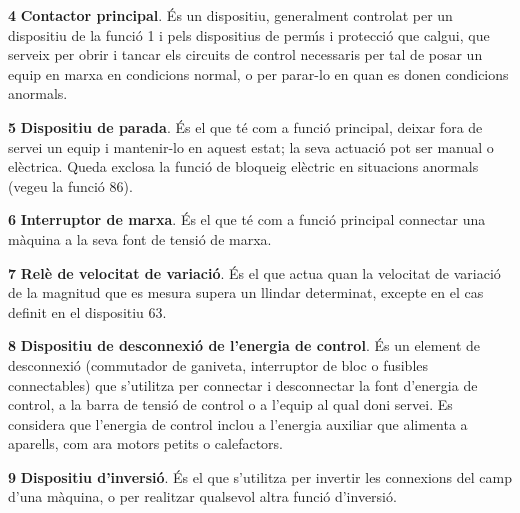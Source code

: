 \begin{multicols}{2}
\begin{list}{}
\item[\textbf{4}]  
 \textbf{Contactor principal}. \'{E}s un dispositiu,
generalment controlat per un dispositiu de la funci\'{o} 1 i pels dispositius de perm\'{\i}s i protecci\'{o}
que calgui, que serveix per obrir i tancar els circuits de control necessaris per tal de
posar un equip en marxa en condicions normal, o per parar-lo en quan es donen condicions anormals.

\item[\textbf{5}]    
 \textbf{Dispositiu de parada}. \'{E}s el que
t\'{e} com a funci\'{o} principal, deixar fora de servei un equip i
mantenir-lo en aquest estat; la seva actuaci\'{o} pot ser manual o
el\`{e}ctrica. Queda exclosa la funci\'{o} de bloqueig el\`{e}ctric en
situacions anormals (vegeu la funci\'{o} 86).

\item[\textbf{6}]  
\textbf{Interruptor de marxa}. \'{E}s
el que t\'{e} com a funci\'{o} principal connectar una m\`{a}quina a la seva font de tensi\'{o} de marxa.

\item[\textbf{7}]    
\textbf{Rel\`{e} de velocitat de variaci\'{o}}. \'{E}s el que
actua quan la velocitat de variaci\'{o} de la magnitud que es mesura supera un llindar determinat, excepte en el cas definit en el dispositiu 63.

\item[\textbf{8}]   
\textbf{Dispositiu de desconnexi\'{o} de l'energia
de control}. \'{E}s un element de desconnexi\'{o} (commutador de ganiveta,
interruptor de bloc o fusibles connectables) que s'utilitza per
connectar i desconnectar la font d'energia de control,  a la barra
de tensi\'{o} de control o a l'equip al qual doni servei. Es considera
que l'energia de control inclou a l'energia auxiliar que alimenta a
aparells, com ara motors petits o calefactors.

\item[\textbf{9}]   
\textbf{Dispositiu d'inversi\'{o}}. \'{E}s el
que s'utilitza per invertir les connexions del camp d'una m\`{a}quina, o
per realitzar qualsevol altra funci\'{o}  d'inversi\'{o}.


\end{list}
\end{multicols}
